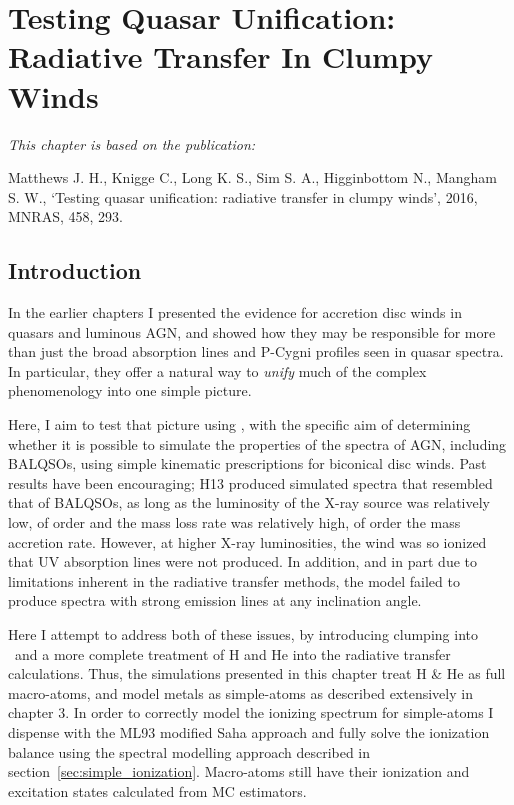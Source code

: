 \chapter{Testing Quasar Unification: Radiative Transfer In Clumpy Winds}


{\em This chapter is based on the publication:

Matthews J. H., Knigge C., Long K. S., Sim S. A., Higginbottom N., Mangham S. W., 
`Testing quasar unification: radiative transfer in clumpy winds',
2016, MNRAS, 458, 293.}


%
%

\section{Introduction}

In the earlier chapters I presented the evidence for accretion disc
winds in quasars and luminous AGN, and showed how they may be responsible
for more than just the broad absorption lines and P-Cygni profiles
seen in quasar spectra. In particular, they offer a natural way to
{\em unify} much of the complex phenomenology into one simple picture.

Here, I aim to test that picture using \py, with
the specific aim of determining whether it is possible to 
simulate the properties of the spectra of AGN, including BALQSOs, 
using simple kinematic prescriptions for biconical disc winds. 
Past results have been encouraging; H13
produced simulated spectra that resembled that of BALQSOs, as long as 
the luminosity of the X-ray source was relatively low, of order 
 and the mass loss rate was relatively high, of order the 
mass accretion rate.  However, at higher X-ray luminosities, the wind was
so ionized that UV absorption lines were not produced.  In addition, and 
in part due to limitations inherent in 
the radiative transfer methods, the model failed 
to produce spectra with strong emission lines at any inclination angle.

Here I attempt to address both of these issues, by
introducing clumping into \py\ and a more complete
treatment of H and He into the radiative transfer calculations.
Thus, the simulations presented in this chapter treat H \& He as full
macro-atoms, and model metals as simple-atoms as described extensively
in chapter 3. In order to correctly model the ionizing spectrum for simple-atoms 
I dispense with the ML93 modified Saha approach and fully solve the ionization
balance using the spectral modelling approach described 
in section~\ref{sec:simple_ionization}. Macro-atoms still have their
ionization and excitation states calculated from MC estimators.

